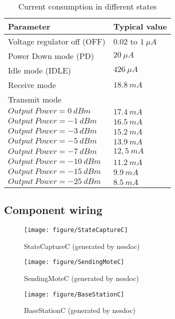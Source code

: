 \documentclass[a4paper,11pt]{article}
\begin{document}
	\begin{table}[h] \footnotesize
	\begin{tabularx}{\textwidth}{ | X | X |}
		\hline
		\bf{Parameter} & \bf{Typical value} \\
		\hline
		\hline
		Voltage regulator off (OFF) & $0.02$ to $1\ \mu A$ \\
		\hline
		Power Down mode (PD) & $20\ \mu A$ \\
		\hline
		Idle mode (IDLE) & $426\ \mu A$ \\
		\hline
		Receive mode & $18.8\ mA$ \\
		\hline
		Transmit mode & \\
		$Output\ Power = 0\ dBm $ & $17.4\ mA$ \\
		$Output\ Power = -1\ dBm $ & $16.5\ mA$ \\
		$Output\ Power = -3\ dBm $ & $15.2\ mA$ \\
		$Output\ Power = -5\ dBm $ & $13.9\ mA$ \\
		$Output\ Power = -7\ dBm $ & $12,5\ mA$ \\
		$Output\ Power = -10\ dBm $ & $11.2\ mA$ \\
		$Output\ Power = -15\ dBm $ & $9.9\ mA$ \\
		$Output\ Power = -25\ dBm $ & $8.5\ mA$ \\
		\hline
	\end{tabularx}
	\caption{Current consumption in different states}
	\end{table}

  \subsection*{Component wiring}

  \begin{figure}[h]
    \texttt{[image: figure/StateCaptureC]}
    \caption{StateCaptureC (generated by nesdoc)}
    \label{fig:statecapturec}
  \end{figure}

  \begin{figure}[h]
    \texttt{[image: figure/SendingMoteC]}
    \caption{SendingMoteC (generated by nesdoc)}
    \label{fig:sendingmotec}
  \end{figure}

\clearpage

  \begin{figure}[ht]
    \texttt{[image: figure/BaseStationC]}
    \caption{BaseStationC (generated by nesdoc)}
    \label{fig:basestationc}
  \end{figure}
\end{document}
